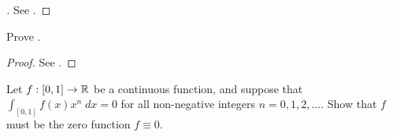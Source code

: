 \begin{proof}[]
  See .
\end{proof}

\begin{ex}\label{ii:ex:3.8.7}
  Prove .
\end{ex}

\begin{proof}
  See .
\end{proof}

\begin{ex}\label{ii:ex:3.8.8}
  Let \(f : [0, 1] \to \mathbb{R}\) be a continuous function, and suppose that \(\int_{[0, 1]} f(x) x^n \; dx = 0\) for all non-negative integers \(n = 0, 1, 2, \dots\).
  Show that \(f\) must be the zero function \(f \equiv 0\).
\end{ex}

